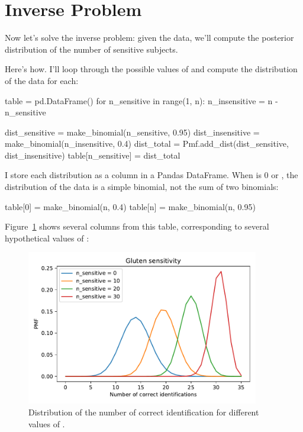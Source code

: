 \documentclass[12pt]{book}
\theoremstyle{exercise}
\begin{document}
\section{Inverse Problem}

Now let's solve the inverse problem: given the data, we'll compute the posterior distribution of the number of sensitive subjects.

Here's how.  I'll loop through the possible values of  and compute the distribution of the data for each:

\begin{code}
table = pd.DataFrame()
for n_sensitive in range(1, n):
    n_insensitive = n - n_sensitive

    dist_sensitive = make_binomial(n_sensitive, 0.95)
    dist_insensitive = make_binomial(n_insensitive, 0.4)
    dist_total = Pmf.add_dist(dist_sensitive, dist_insensitive)    
    table[n_sensitive] = dist_total
\end{code}

I store each distribution as a column in a Pandas DataFrame.
When  is 0 or , the distribution of the data is a simple binomial, not the sum of two binomials:

\begin{code}
table[0] = make_binomial(n, 0.4)
table[n] = make_binomial(n, 0.95)
\end{code}

Figure~\ref{fig05-03} shows several columns from this table, corresponding to several hypothetical values of :

\begin{figure}
\centerline{\includegraphics[width=4in]{figs/fig05-03.pdf}}
\caption{Distribution of the number of correct identification for different values of .}
\label{fig05-03}
\end{figure}
\end{document}
